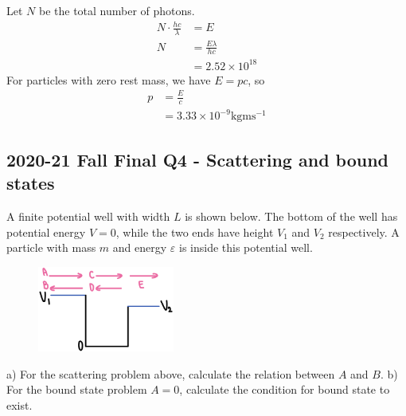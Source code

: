 \documentclass[12pt]{book} %
\numberwithin{equation}{chapter}
\def\e{\varepsilon}
\def\l{\lambda}
\begin{document}
\begin{solbox}
Let $N$ be the total number of photons.
\begin{align*}
N\cdot \frac{hc}{\l}&=E\\
N&=\frac{E\l}{hc}\\
&=2.52\times10^{18}
\end{align*}
For particles with zero rest mass, we have $E=pc$, so
\begin{align*}
p&=\frac{E}{c}\\
&=3.33\times10^{-9}\text{kg}\text{m}\text{s}^{-1}
\end{align*}
\end{solbox}

\subsection*{2020-21 Fall Final Q4 - Scattering and bound states}
A finite potential well with width $L$ is shown below. The bottom of the well has potential energy $V=0$, while the two ends have height $V_{1}$ and $V_{2}$ respectively. A particle with mass $m$ and energy $\e$ is inside this potential well.
\begin{figure}[H]
\centering
\includegraphics[width=0.4\textwidth]{Scattering and bound states}
\end{figure}
\noindent a) For the scattering problem above, calculate the relation between $A$ and $B$.\bigskip\newline
b) For the bound state problem $A=0$, calculate the condition for bound state to exist.
\end{document}
